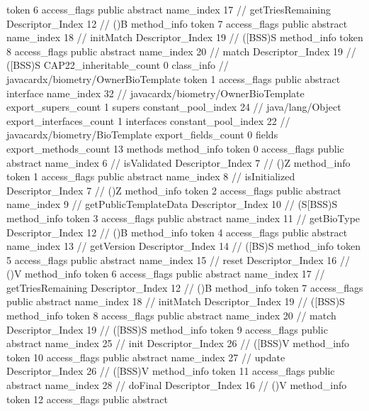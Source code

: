 {{{{{					token	6
					access_flags	public abstract
					name_index	17		// getTriesRemaining
					Descriptor_Index	12		// ()B
				}
				method_info {
					token	7
					access_flags	public abstract
					name_index	18		// initMatch
					Descriptor_Index	19		// ([BSS)S
				}
				method_info {
					token	8
					access_flags	public abstract
					name_index	20		// match
					Descriptor_Index	19		// ([BSS)S
				}
			}
			CAP22_inheritable_count	0
		}
		class_info {		// javacardx/biometry/OwnerBioTemplate
			token	1
			access_flags	public abstract interface
			name_index	32		// javacardx/biometry/OwnerBioTemplate
			export_supers_count	1
			supers {
				constant_pool_index	24		// java/lang/Object
			}
			export_interfaces_count	1
			interfaces {
				constant_pool_index	22		// javacardx/biometry/BioTemplate
			}
			export_fields_count	0
			fields {
			}
			export_methods_count	13
			methods {
				method_info {
					token	0
					access_flags	public abstract
					name_index	6		// isValidated
					Descriptor_Index	7		// ()Z
				}
				method_info {
					token	1
					access_flags	public abstract
					name_index	8		// isInitialized
					Descriptor_Index	7		// ()Z
				}
				method_info {
					token	2
					access_flags	public abstract
					name_index	9		// getPublicTemplateData
					Descriptor_Index	10		// (S[BSS)S
				}
				method_info {
					token	3
					access_flags	public abstract
					name_index	11		// getBioType
					Descriptor_Index	12		// ()B
				}
				method_info {
					token	4
					access_flags	public abstract
					name_index	13		// getVersion
					Descriptor_Index	14		// ([BS)S
				}
				method_info {
					token	5
					access_flags	public abstract
					name_index	15		// reset
					Descriptor_Index	16		// ()V
				}
				method_info {
					token	6
					access_flags	public abstract
					name_index	17		// getTriesRemaining
					Descriptor_Index	12		// ()B
				}
				method_info {
					token	7
					access_flags	public abstract
					name_index	18		// initMatch
					Descriptor_Index	19		// ([BSS)S
				}
				method_info {
					token	8
					access_flags	public abstract
					name_index	20		// match
					Descriptor_Index	19		// ([BSS)S
				}
				method_info {
					token	9
					access_flags	public abstract
					name_index	25		// init
					Descriptor_Index	26		// ([BSS)V
				}
				method_info {
					token	10
					access_flags	public abstract
					name_index	27		// update
					Descriptor_Index	26		// ([BSS)V
				}
				method_info {
					token	11
					access_flags	public abstract
					name_index	28		// doFinal
					Descriptor_Index	16		// ()V
				}
				method_info {
					token	12
					access_flags	public abstract
}}}}}
